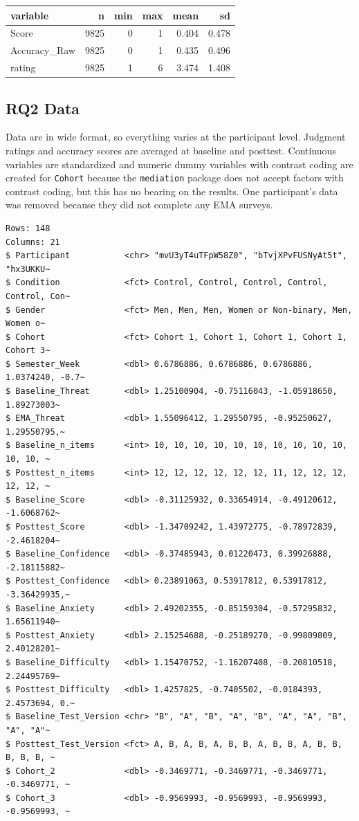 \documentclass[
  letterpaper,
  DIV=11,
  numbers=noendperiod]{scrreprt}
\begin{document}
\begin{longtable}[]{@{}lrrrrr@{}}
\toprule\noalign{}
variable & n & min & max & mean & sd \\
\midrule\noalign{}
\endhead
\bottomrule\noalign{}
\endlastfoot
Score & 9825 & 0 & 1 & 0.404 & 0.478 \\
Accuracy\_Raw & 9825 & 0 & 1 & 0.435 & 0.496 \\
rating & 9825 & 1 & 6 & 3.474 & 1.408 \\
\end{longtable}

\subsection{RQ2 Data}\label{rq2-data}

Data are in wide format, so everything varies at the participant level.
Judgment ratings and accuracy scores are averaged at baseline and
posttest. Continuous variables are standardized and numeric dummy
variables with contrast coding are created for \texttt{Cohort} because
the \texttt{mediation} package does not accept factors with contrast
coding, but this has no bearing on the results. One participant's data
was removed because they did not complete any EMA surveys.

\begin{verbatim}
Rows: 148
Columns: 21
$ Participant           <chr> "mvU3yT4uTFpW58Z0", "bTvjXPvFUSNyAt5t", "hx3UKKU~
$ Condition             <fct> Control, Control, Control, Control, Control, Con~
$ Gender                <fct> Men, Men, Men, Women or Non-binary, Men, Women o~
$ Cohort                <fct> Cohort 1, Cohort 1, Cohort 1, Cohort 1, Cohort 3~
$ Semester_Week         <dbl> 0.6786886, 0.6786886, 0.6786886, 1.0374240, -0.7~
$ Baseline_Threat       <dbl> 1.25100904, -0.75116043, -1.05918650, 1.89273003~
$ EMA_Threat            <dbl> 1.55096412, 1.29550795, -0.95250627, 1.29550795,~
$ Baseline_n_items      <int> 10, 10, 10, 10, 10, 10, 10, 10, 10, 10, 10, 10, ~
$ Posttest_n_items      <int> 12, 12, 12, 12, 12, 12, 11, 12, 12, 12, 12, 12, ~
$ Baseline_Score        <dbl> -0.31125932, 0.33654914, -0.49120612, -1.6068762~
$ Posttest_Score        <dbl> -1.34709242, 1.43972775, -0.78972839, -2.4618204~
$ Baseline_Confidence   <dbl> -0.37485943, 0.01220473, 0.39926888, -2.18115882~
$ Posttest_Confidence   <dbl> 0.23891063, 0.53917812, 0.53917812, -3.36429935,~
$ Baseline_Anxiety      <dbl> 2.49202355, -0.85159304, -0.57295832, 1.65611940~
$ Posttest_Anxiety      <dbl> 2.15254688, -0.25189270, -0.99809809, 2.40128201~
$ Baseline_Difficulty   <dbl> 1.15470752, -1.16207408, -0.20810518, 2.24495769~
$ Posttest_Difficulty   <dbl> 1.4257825, -0.7405502, -0.0184393, 2.4573694, 0.~
$ Baseline_Test_Version <chr> "B", "A", "B", "A", "B", "A", "A", "B", "A", "A"~
$ Posttest_Test_Version <fct> A, B, A, B, A, B, B, A, B, B, A, B, B, B, B, B, ~
$ Cohort_2              <dbl> -0.3469771, -0.3469771, -0.3469771, -0.3469771, ~
$ Cohort_3              <dbl> -0.9569993, -0.9569993, -0.9569993, -0.9569993, ~
\end{verbatim}
\end{document}

